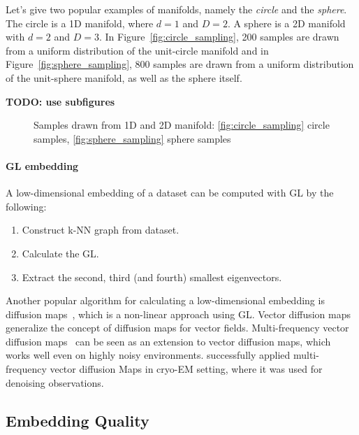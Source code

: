 Let's give two popular examples of manifolds, namely the \textit{circle} and the \textit{sphere}.
The circle is a 1D manifold, where $d=1$ and $D=2$. A sphere is a 2D manifold with $d=2$ and $D=3$.
In Figure~\ref{fig:circle_sampling}, 200 samples are drawn from a uniform distribution of the unit-circle manifold
and in Figure~\ref{fig:sphere_sampling}, 800 samples are drawn from a uniform distribution of the unit-sphere manifold,
as well as the sphere itself.


\textbf{TODO: use subfigures}
\begin{figure}[H]
    \hfill
    \hfill
    \hfill
        \caption{Samples drawn from 1D and 2D manifold: 
    \ref{fig:circle_sampling} circle samples,
    \ref{fig:sphere_sampling} sphere samples}
\end{figure}


\paragraph{GL embedding}
\label{sec:manifold_calculation}
A low-dimensional embedding of a dataset can be computed with GL by the following:

\begin{enumerate}
    \item Construct k-NN graph from dataset.
    \item Calculate the GL.
    \item Extract the second, third (and fourth) smallest eigenvectors.
\end{enumerate}

Another popular algorithm for calculating a low-dimensional embedding is diffusion maps~\cite{diffusionMaps}, 
which is a non-linear approach using GL.
Vector diffusion maps~\cite{vectorDiffusionMaps} generalize the concept of diffusion maps for vector fields.
Multi-frequency vector diffusion maps~\cite{multiDiffusionMaps} 
can be seen as an extension to vector diffusion maps, which works well even on highly noisy environments.
\citet{cryoEmMutliDM} successfully applied multi-frequency vector diffusion Maps in cryo-EM setting,
 where it was used for denoising observations.


\subsection{Embedding Quality}
\label{sec:embedding_quality}

